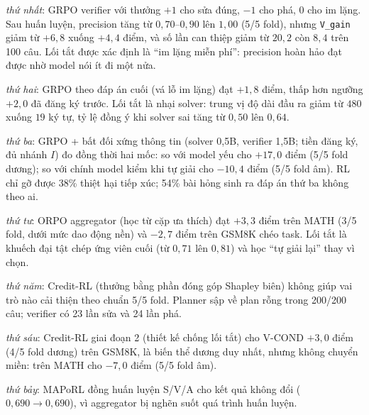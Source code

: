 \emph{thứ nhất}: GRPO verifier với thưởng $+1$ cho sửa đúng, $-1$ cho phá, $0$ cho im lặng. Sau huấn luyện, precision tăng từ $0{,}70$--$0{,}90$ lên $1{,}00$ (5/5 fold), nhưng \texttt{V\_gain} giảm từ $+6{,}8$ xuống $+4{,}4$ điểm, và số lần can thiệp giảm từ $20{,}2$ còn $8{,}4$ trên 100 câu. Lối tắt được xác định là “im lặng miễn phí”: precision hoàn hảo đạt được nhờ model nói ít đi một nửa.


\emph{thứ hai}: GRPO theo đáp án cuối (vá lỗ im lặng) đạt $+1{,}8$ điểm, thấp hơn ngưỡng $+2{,}0$ đã đăng ký trước. Lối tắt là nhại solver: trung vị độ dài đầu ra giảm từ $480$ xuống $19$ ký tự, tỷ lệ đồng ý khi solver sai tăng từ $0{,}50$ lên $0{,}64$.

\emph{thứ ba}: GRPO + bất đối xứng thông tin (solver 0,5B, verifier 1,5B; tiền đăng ký, đủ nhánh $I$) đo đồng thời hai mốc: so với model yếu cho $+17{,}0$ điểm (5/5 fold dương); so với chính model kiểm khi tự giải cho $-10{,}4$ điểm (5/5 fold âm). RL chỉ gỡ được 38\% thiệt hại tiếp xúc; 54\% bài hỏng sinh ra đáp án thứ ba không theo ai.

\emph{thứ tư}: ORPO aggregator (học từ cặp ưa thích) đạt $+3{,}3$ điểm trên MATH (3/5 fold, dưới mức dao động nền) và $-2{,}7$ điểm trên GSM8K chéo task. Lối tắt là khuếch đại tật chép ứng viên cuối (từ $0{,}71$ lên $0{,}81$) và học “tự giải lại” thay vì chọn.

\emph{thứ năm}: Credit-RL (thưởng bằng phần đóng góp Shapley biên) không giúp vai trò nào cải thiện theo chuẩn 5/5 fold. Planner sập về plan rỗng trong 200/200 câu; verifier có 23 lần sửa và 24 lần phá.

\emph{thứ sáu}: Credit-RL giai đoạn 2 (thiết kế chống lối tắt) cho V-COND $+3{,}0$ điểm (4/5 fold dương) trên GSM8K, là biến thể dương duy nhất, nhưng không chuyển miền: trên MATH cho $-7{,}0$ điểm (5/5 fold âm).

\emph{thứ bảy}: MAPoRL đồng huấn luyện S/V/A cho kết quả không đổi ($0{,}690 \to 0{,}690$), vì aggregator bị nghẽn suốt quá trình huấn luyện.

